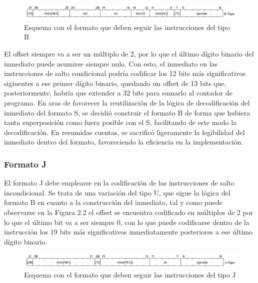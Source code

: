 \vspace{+0.3cm}
\begin{figure}[h]
  \centering
  \includegraphics[width=0.95 \linewidth]{res/img/formato-b.png}
  \caption{Esquema con el formato que deben seguir las instrucciones del tipo B}
\end{figure}

El offset siempre va a ser un múltiplo de 2, por lo que el último dígito binario del inmediato puede asumirse siempre nulo. Con esto, el inmediato en las instrucciones de salto condicional podría codificar los 12 bits más significativos sigiuentes a ese primer dígito binario, quedando un offset de 13 bits que, posteriormente, habría que extender a 32 bits para sumarlo al contador de programa. En aras de favorecer la reutilización de la lógica de decodificación del inmediato del formato S, se decidió construir el formato B de forma que hubiera tanta superposición como fuera posible con el S, facilitando de este modo la decodificación. En resumidas cuentas, se sacrificó ligeramente la legibilidad del inmediato dentro del formato, favoreciendo la eficiencia en la implementación.

\subsubsection{Formato J}

El formato J debe emplearse en la codificación de las instrucciones de salto incondicional. Se trata de una variación del tipo U, que sigue la lógica del formato B en cuanto a la construcción del inmediato, tal y como puede observarse en la Figura 2.2 el offset se encuentra codificado en múltiplos de 2 por lo que el último bit va a ser siempre 0, con lo que puede codificarse dentro de la instrucción los 19 bits más significativos inmediatamente posteriores a ese último dígito binario.

\vspace{+0.3cm}
\begin{figure}[h]
  \centering
  \includegraphics[width=0.95 \linewidth]{res/img/formato-j.png}
  \caption{Esquema con el formato que deben seguir las instrucciones del tipo J}
\end{figure}

